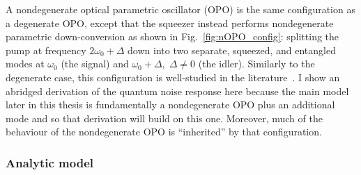 A nondegenerate optical parametric oscillator (OPO) is the same configuration as a degenerate OPO, except that the squeezer instead performs nondegenerate parametric down-conversion as shown in Fig.~\ref{fig:nOPO_config}: splitting the pump at frequency $2\omega_0+\Delta$ down into two separate, squeezed, and entangled modes at $\omega_0$ (the signal) and $\omega_0+\Delta,\; \Delta\neq0$ (the idler). Similarly to the degenerate case, this configuration is well-studied in the literature~\cite{}. I show an abridged derivation of the quantum noise response here because the main model later in this thesis is fundamentally a nondegenerate OPO plus an additional mode and so that derivation will build on this one. Moreover, much of the behaviour of the nondegenerate OPO is ``inherited'' by that configuration. %

\subsubsection{Analytic model}

